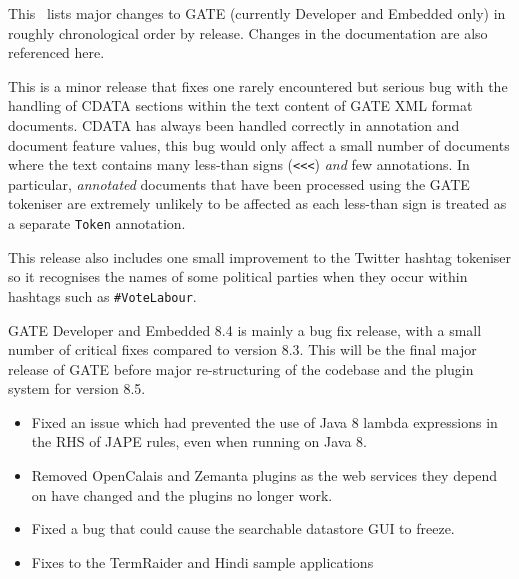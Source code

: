%
%
%
%


This \chapthing\ lists major changes to GATE (currently Developer and Embedded
only) in roughly chronological order by
release. Changes in the documentation are also referenced here.




This is a minor release that fixes one rarely encountered but serious bug with
the handling of CDATA sections within the text content of GATE XML format
documents.  CDATA has always been handled correctly in annotation and document
feature values, this bug would only affect a small number of documents where
the text contains many less-than signs (\verb!<<<!) \emph{and} few annotations.
In particular, \emph{annotated} documents that have been processed using the
GATE tokeniser are extremely unlikely to be affected as each less-than sign is
treated as a separate \texttt{Token} annotation.

This release also includes one small improvement to the Twitter hashtag
tokeniser so it recognises the names of some political parties when they occur
within hashtags such as \verb!#VoteLabour!.


GATE Developer and Embedded 8.4 is mainly a bug fix release, with a small
number of critical fixes compared to version 8.3.  This will be the final
major release of GATE before major re-structuring of the codebase and the plugin
system for version 8.5.

\begin{itemize}
\item Fixed an issue which had prevented the use of Java 8 lambda expressions
  in the RHS of JAPE rules, even when running on Java 8.
\item Removed OpenCalais and Zemanta plugins as the web services they depend on
  have changed and the plugins no longer work.
\item Fixed a bug that could cause the searchable datastore GUI to freeze.
\item Fixes to the TermRaider and Hindi sample applications
\end{itemize}

